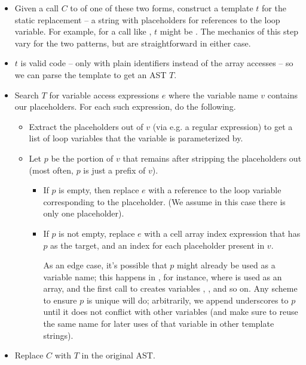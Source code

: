 \begin{itemize}

  \item Given a call $C$ to  of one of these two forms, construct a
    template $t$ for the static replacement -- a string with placeholders for
    references to the loop variable. For example, for a call like
    , $t$ might be
    . The mechanics of this step vary for the two
    patterns, but are straightforward in either case.

  \item $t$ is valid \matlab code -- only with plain identifiers instead
    of the array accesses -- so we can parse the template to get an AST $T$.

  \item Search $T$ for variable access expressions $e$ where the variable name
    $v$ contains our placeholders. For each such expression, do the following.

    \begin{itemize}

      \item Extract the placeholders out of $v$ (via e.g. a regular expression)
        to get a list of loop variables that the variable is parameterized by.

      \item Let $p$ be the portion of $v$ that remains after stripping the
        placeholders out (most often, $p$ is just a prefix of $v$).

      \begin{itemize}

        \item  If $p$ is empty, then replace $e$ with a reference to the loop
          variable corresponding to the placeholder. (We assume in this case
          there is only one placeholder).

        \item If $p$ is not empty, replace $e$ with a cell array index
          expression that has $p$ as the target, and an index for each
          placeholder present in $v$.

          As an edge case, it's possible that $p$ might already be used as a
          variable name; this happens in , for
          instance, where  is used as an array, and the first call to
           creates variables , , and so on. Any
          scheme to ensure $p$ is unique will do; arbitrarily, we append
          underscores to $p$ until it does not conflict with other variables
          (and make sure to reuse the same name for later uses of that variable
          in other template strings).

      \end{itemize}

    \end{itemize}

  \item Replace $C$ with $T$ in the original AST.

\end{itemize}

